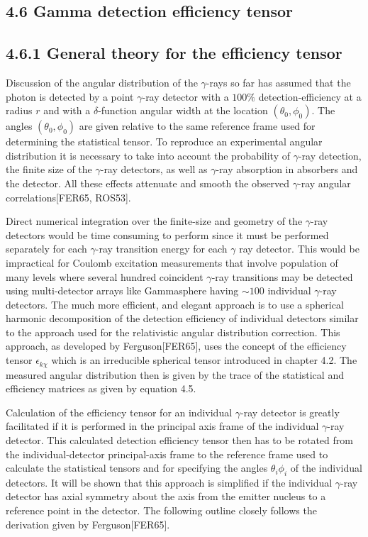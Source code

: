 \documentclass[10pt]{article}
\begin{document}
\subsection*{4.6 Gamma detection efficiency tensor}
\subsection*{4.6.1 General theory for the efficiency tensor}
Discussion of the angular distribution of the $\gamma$-rays so far has assumed that the photon is detected by a point $\gamma$-ray detector with a $100 \%$ detection-efficiency at a radius $r$ and with a $\delta$-function angular width at the location $\left(\theta_{0}, \phi_{0}\right)$. The angles $\left(\theta_{0}, \phi_{0}\right)$ are given relative to the same reference frame used for determining the statistical tensor. To reproduce an experimental angular distribution it is necessary to take into account the probability of $\gamma$-ray detection, the finite size of the $\gamma$-ray detectors, as well as $\gamma$-ray absorption in absorbers and the detector. All these effects attenuate and smooth the observed $\gamma$-ray angular correlations[FER65, ROS53].

Direct numerical integration over the finite-size and geometry of the $\gamma$-ray detectors would be time consuming to perform since it must be performed separately for each $\gamma$-ray transition energy for each $\gamma$ ray detector. This would be impractical for Coulomb excitation measurements that involve population of many levels where several hundred coincident $\gamma$-ray transitions may be detected using multi-detector arrays like Gammasphere having $\sim 100$ individual $\gamma$-ray detectors. The much more efficient, and elegant approach is to use a spherical harmonic decomposition of the detection efficiency of individual detectors similar to the approach used for the relativistic angular distribution correction. This approach, as developed by Ferguson[FER65], uses the concept of the efficiency tensor $\epsilon_{k \chi}$ which is an irreducible spherical tensor introduced in chapter 4.2. The measured angular distribution then is given by the trace of the statistical and efficiency matrices as given by equation 4.5.

Calculation of the efficiency tensor for an individual $\gamma$-ray detector is greatly facilitated if it is performed in the principal axis frame of the individual $\gamma$-ray detector. This calculated detection efficiency tensor then has to be rotated from the individual-detector principal-axis frame to the reference frame used to calculate the statistical tensors and for specifying the angles $\theta_{i} \phi_{i}$ of the individual detectors. It will be shown that this approach is simplified if the individual $\gamma$-ray detector has axial symmetry about the axis from the emitter nucleus to a reference point in the detector. The following outline closely follows the derivation given by Ferguson[FER65].
\end{document}
